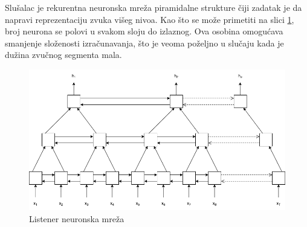 \documentclass[a4paper]{article}
\begin{document}
Slušalac je rekurentna neuronska mreža piramidalne strukture čiji zadatak je da napravi reprezentaciju zvuka višeg nivoa. 
Kao što se može primetiti na slici \ref{fig:listener_model}, broj neurona se polovi u svakom sloju do izlaznog.
Ova osobina omogućava smanjenje složenosti izračunavanja, što je veoma poželjno u slučaju kada je dužina zvučnog segmenta mala.
\begin{figure}[h!]
  \begin{center}
    \includegraphics[scale=0.3]{listener.png}
  \end{center}
  \caption{Listener neuronska mreža}
  \label{fig:listener_model}
\end{figure}
\end{document}
